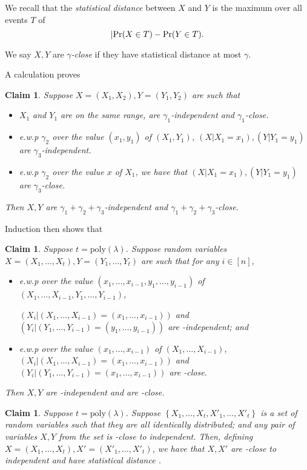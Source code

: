 \documentclass[11pt]{article}
\numberwithin{equation}{section} %
\numberwithin{figure}{section} %
\newtheorem{claim}[thm]{Claim}
\newcommand{\set}[1]{\ensuremath{\left\{#1\right\}}\xspace}
\newcommand{\poly}{\ensuremath{\mathrm{poly}(\lambda)}\xspace}
\begin{document}
We recall that the \emph{statistical distance} between $X$ and $Y$ is the maximum over all events $T$ of
\[|\mathrm{Pr}(X\in T) - \mathrm{Pr}(Y\in T).\]

We say $X,Y$ are \emph{$\gamma$-close} if they have statistical distance at most $\gamma$.

A calculation proves
\begin{claim}\label{clm:close_to_ind}
 Suppose $X=(X_1,X_2), Y=(Y_1,Y_2)$ are such that 
 \begin{itemize}
 \item $X_1$ and $Y_1$ are on the same range, are $\gamma_1$-independent and $\gamma_1$-close.
  \item 
 e.w.p $\gamma_2$ over the value $(x_1,y_1)$ of $(X_1,Y_1)$, $(X|X_1=x_1), (Y|Y_1 = y_1)$ are $\gamma_3$-independent.
 \item e.w.p $\gamma_2$ over the value $x$ of $X_1$, we have that $(X|X_1=x_1), (Y|Y_1=y_1)$ are $\gamma_3$-close.
 \end{itemize}

 Then $X,Y$ are $\gamma_1+\gamma_2+\gamma_3$-independent and $\gamma_1+\gamma_2+\gamma_3$-close.
 \end{claim}

 Induction then shows that
 \begin{claim}\label{clm:neg_close_to_ind}
  Suppose $t=\poly$. Suppose random variables $X=(X_1,\ldots,X_t),Y=(Y_1,\ldots,Y_t)$ are such that
  for any $i\in [n]$,
  
  \begin{itemize}
   \item 
e.w.p \negl over the value $(x_1,\ldots,x_{i-1},y_1,\ldots,y_{i-1})$ of $(X_1,\ldots,X_{i-1},Y_{1},\ldots,Y_{i-1})$,

  $(X_i|(X_1,\ldots,X_{i-1})=(x_1,\ldots,x_{i-1}))$ and $(Y_i|(Y_1,\ldots,Y_{i-1})=(y_1,\ldots,y_{i-1}))$ are \negl-independent;
  and
  \item e.w.p \negl over the value $(x_1,\ldots,x_{i-1})$ of $(X_1,\ldots,X_{i-1})$,
  $(X_i|(X_1,\ldots,X_{i-1})=(x_1,\ldots,x_{i-1}))$ and $(Y_i|(Y_1,\ldots,Y_{i-1})=(x_1,\ldots,x_{i-1}))$
  are \negl-close.
  \end{itemize}
  Then $X,Y$ are \negl-independent and are \negl-close.
 \end{claim}


\begin{claim}\label{clm:pairs_to_all}
 Suppose $t=\poly$. Suppose \set{X_1,\ldots,X_t,X'_1,\ldots,X'_t} is a set of random variables such that
 they are all identically distributed; and any pair of variables $X,Y$ from the set is \negl-close to independent.
 Then, defining $X=(X_1,\ldots,X_t), X'=(X'_1,\ldots,X'_t)$, we have that $X,X'$ are \negl-close to independent and 
 have statistical distance \negl.
\end{claim}
\end{document}
